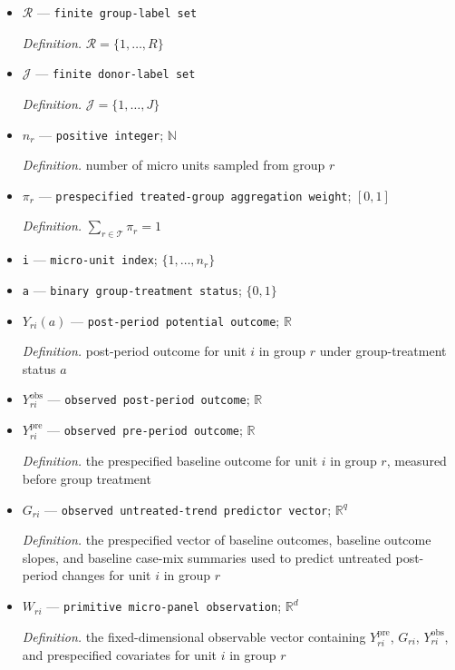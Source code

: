 \documentclass{article}
\begin{document}
\begin{itemize}
  \item \(\mathcal R\) --- \texttt{finite group-\allowbreak{}label set}
  \par\smallskip\noindent\emph{Definition.} \(\mathcal R=\{1,\ldots,R\}\)
  \item \(\mathcal J\) --- \texttt{finite donor-\allowbreak{}label set}
  \par\smallskip\noindent\emph{Definition.} \(\mathcal J=\{1,\ldots,J\}\)
  \item \(n_r\) --- \texttt{positive integer}; \(\mathbb N\)
  \par\smallskip\noindent\emph{Definition.} number of micro units sampled from group \(r\)
  \item \(\pi_r\) --- \texttt{prespecified treated-\allowbreak{}group aggregation weight}; \([0,1]\)
  \par\smallskip\noindent\emph{Definition.} \(\sum_{r\in\mathcal T}\pi_r=1\)
  \item \texttt{i} --- \texttt{micro-\allowbreak{}unit index}; \(\{1,\ldots,n_r\}\)
  \item \texttt{a} --- \texttt{binary group-\allowbreak{}treatment status}; \(\{0,1\}\)
  \item \(Y_{ri}(a)\) --- \texttt{post-\allowbreak{}period potential outcome}; \(\mathbb R\)
  \par\smallskip\noindent\emph{Definition.} post-period outcome for unit \(i\) in group \(r\) under group-treatment status \(a\)
  \item \(Y_{ri}^{\mathrm{obs}}\) --- \texttt{observed post-\allowbreak{}period outcome}; \(\mathbb R\)
  \item \(Y_{ri}^{\mathrm{pre}}\) --- \texttt{observed pre-\allowbreak{}period outcome}; \(\mathbb R\)
  \par\smallskip\noindent\emph{Definition.} the prespecified baseline outcome for unit \(i\) in group \(r\), measured before group treatment
  \item \(G_{ri}\) --- \texttt{observed untreated-\allowbreak{}trend predictor vector}; \(\mathbb R^q\)
  \par\smallskip\noindent\emph{Definition.} the prespecified vector of baseline outcomes, baseline outcome slopes, and baseline case-mix summaries used to predict untreated post-period changes for unit \(i\) in group \(r\)
  \item \(W_{ri}\) --- \texttt{primitive micro-\allowbreak{}panel observation}; \(\mathbb R^d\)
  \par\smallskip\noindent\emph{Definition.} the fixed-dimensional observable vector containing \(Y_{ri}^{\mathrm{pre}}\), \(G_{ri}\), \(Y_{ri}^{\mathrm{obs}}\), and prespecified covariates for unit \(i\) in group \(r\)

\end{itemize}
\end{document}
